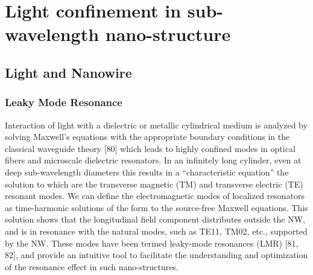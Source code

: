 \chapter{Light confinement in sub-wavelength nano-structure} \label{LM}


\section{Light and Nanowire} \label{corrections}


\subsection{Leaky Mode Resonance}
\label{sec:hydrogen}
Interaction of light with a dielectric or metallic cylindrical medium is analyzed by solving Maxwell's equations with the appropriate boundary conditions in the classical waveguide theory [80] which leads to highly confined modes in optical fibers and microscale dielectric resonators. In an infinitely long cylinder, even at deep sub-wavelength diameters this results in a “characteristic equation” the solution to which are the transverse magnetic (TM) and transverse electric (TE) resonant modes. We can define the electromagnetic modes of localized resonators as time-harmonic solutions of the form  to the source-free Maxwell equations. This solution shows that the longitudinal field component distributes outside the NW, and is in resonance with the natural modes, such as TE11, TM02, etc., supported by the NW. These modes have been termed leaky-mode resonances (LMR) [81, 82], and provide an intuitive tool to facilitate the understanding and optimization of the resonance effect in such nano-structures. 
